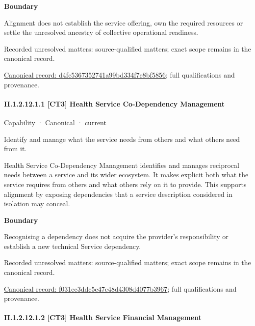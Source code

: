 \textbf{Boundary}



Alignment does not establish the service offering, own the required resources or settle the unresolved ancestry of collective operational readiness.


{\small Recorded unresolved matters: source-qualified matters; exact scope remains in the canonical record.}\par
{\footnotesize \href{../../../../continuum/strategy/capability/d4fc5367352741a99bd334f7e8bf5856.md}{Canonical record: d4fc5367352741a99bd334f7e8bf5856}; full qualifications and provenance.}\par
\paragraph*{II.1.2.12.1.1 [CT3] Health Service Co-Dependency Management}
\label{navigation:II.1.2.12.1.1}

\label{element:f031ee3ddc5e47c48d4308d4077b3967}
{\small Capability · Canonical · current}\par

Identify and manage what the service needs from others and what others need from it.



Health Service Co-Dependency Management identifies and manages reciprocal needs between a service and its wider ecosystem. It makes explicit both what the service requires from others and what others rely on it to provide. This supports alignment by exposing dependencies that a service description considered in isolation may conceal.



\textbf{Boundary}



Recognising a dependency does not acquire the provider's responsibility or establish a new technical Service dependency.


{\small Recorded unresolved matters: source-qualified matters; exact scope remains in the canonical record.}\par
{\footnotesize \href{../../../../continuum/strategy/capability/f031ee3ddc5e47c48d4308d4077b3967.md}{Canonical record: f031ee3ddc5e47c48d4308d4077b3967}; full qualifications and provenance.}\par
\paragraph*{II.1.2.12.1.2 [CT3] Health Service Financial Management}
\label{navigation:II.1.2.12.1.2}

